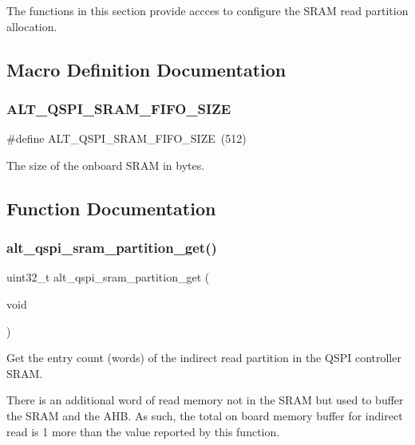 The functions in this section provide accces to configure the S\+R\+AM read partition allocation. 

\subsection{Macro Definition Documentation}
\mbox{\label{group__ALT__QSPI__CFG__SRAM_gadfc85605a06cbd2925967039f1533fdd}} 
\subsubsection{\texorpdfstring{ALT\_QSPI\_SRAM\_FIFO\_SIZE}{ALT\_QSPI\_SRAM\_FIFO\_SIZE}}
{\footnotesize\ttfamily \#define A\+L\+T\+\_\+\+Q\+S\+P\+I\+\_\+\+S\+R\+A\+M\+\_\+\+F\+I\+F\+O\+\_\+\+S\+I\+ZE~(512)}

The size of the onboard S\+R\+AM in bytes. 

\subsection{Function Documentation}
\mbox{\label{group__ALT__QSPI__CFG__SRAM_ga8c07c0b8537b8ecf939809e82ddcf789}} 
\subsubsection{\texorpdfstring{alt\_qspi\_sram\_partition\_get()}{alt\_qspi\_sram\_partition\_get()}}
{\footnotesize\ttfamily uint32\+\_\+t alt\+\_\+qspi\+\_\+sram\+\_\+partition\+\_\+get (\begin{DoxyParamCaption}\item[{void}]{ }\end{DoxyParamCaption})}

Get the entry count (words) of the indirect read partition in the Q\+S\+PI controller S\+R\+AM.

There is an additional word of read memory not in the S\+R\+AM but used to buffer the S\+R\+AM and the A\+HB. As such, the total on board memory buffer for indirect read is 1 more than the value reported by this function.

